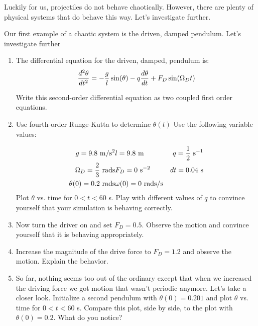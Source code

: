Luckily for us, projectiles do not behave chaotically. However, there
are plenty of physical systems that do behave this way.  Let's
investigate further.
\begin{enumerate}
  \probtwo Our first example of a chaotic system is the driven, damped
  pendulum.  Let's investigate further

\begin{enumerate}
\item The differential equation for the driven, damped, pendulum is:
\begin{equation}
\frac{d^2\theta}{dt^2} = - {g\over l} \sin(\theta) - q
\frac{d\theta}{dt} + F_D \sin(\Omega_D t)
\end{equation}

Write this second-order differential equation as two coupled first
order equations.
\item Use fourth-order Runge-Kutta to determine $\theta(t)$  Use the
  following variable values:

\begin{eqnarray}
g = 9.8 \mathrm{~m/s^2}& l = 9.8 \mathrm{~m} & q = {1\over 2} \mathrm{~s}^{-1}\\
\Omega_D = {2\over 3}\mathrm{~rads} & F_D = 0 \mathrm{~s}^{-2} & dt = 0.04 \mathrm{~s}\\
\theta(0) = 0.2 \mathrm{~rads}& \omega(0) = 0 \mathrm{~rads/s}& \\
\end{eqnarray}
Plot $\theta$ vs. time for $ 0 < t < 60$ s.  Play with different
values of $q$ to convince yourself that your simulation is behaving
correctly.
\item Now turn the driver on and set $F_D = 0.5$.  Observe the motion
  and convince yourself that it is behaving appropriately.
\item Increase the magnitude of the drive force to $F_D = 1.2$ and
  observe the motion. Explain the behavior.
\item So far, nothing seems too out of the ordinary except that when
  we increased the driving force we got motion that wasn't periodic
  anymore.  Let's take a closer look.  Initialize a second pendulum
  with $\theta(0) = 0.201$ and plot $\theta$ vs. time for $ 0 < t <
  60$ s. Compare this plot, side by side, to the plot with $\theta(0)
  = 0.2$.  What do you notice?


\end{enumerate}
\end{enumerate}
